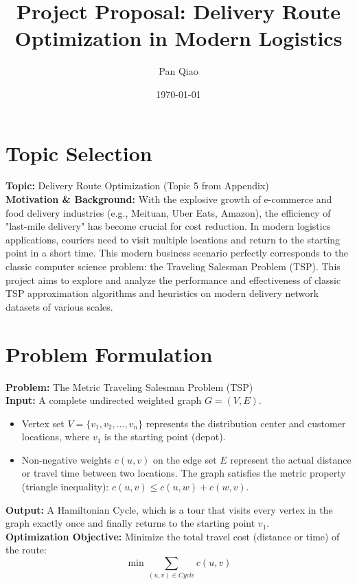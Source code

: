\documentclass[10pt]{article}
\title{\vspace{-1.5cm}Project Proposal: Delivery Route Optimization in Modern Logistics}
\author{Pan Qiao}
\date{\vspace{-0.5cm}\today}
\begin{document}
\maketitle

\section{Topic Selection}
\textbf{Topic:} Delivery Route Optimization (Topic 5 from Appendix)\\
\textbf{Motivation \& Background:} 
With the explosive growth of e-commerce and food delivery industries (e.g., Meituan, Uber Eats, Amazon), the efficiency of "last-mile delivery" has become crucial for cost reduction. In modern logistics applications, couriers need to visit multiple locations and return to the starting point in a short time. This modern business scenario perfectly corresponds to the classic computer science problem: the Traveling Salesman Problem (TSP). This project aims to explore and analyze the performance and effectiveness of classic TSP approximation algorithms and heuristics on modern delivery network datasets of various scales.

\section{Problem Formulation}
\textbf{Problem:} The Metric Traveling Salesman Problem (TSP) \\
\textbf{Input:} A complete undirected weighted graph $G = (V, E)$.
\begin{itemize}
    \item Vertex set $V = \{v_1, v_2, \dots, v_n\}$ represents the distribution center and customer locations, where $v_1$ is the starting point (depot).
    \item Non-negative weights $c(u, v)$ on the edge set $E$ represent the actual distance or travel time between two locations. The graph satisfies the metric property (triangle inequality): $c(u, v) \le c(u, w) + c(w, v)$.
\end{itemize}
\textbf{Output:} A Hamiltonian Cycle, which is a tour that visits every vertex in the graph exactly once and finally returns to the starting point $v_1$.\\
\textbf{Optimization Objective:} Minimize the total travel cost (distance or time) of the route:
\[ \min \sum_{(u,v) \in Cycle} c(u, v) \]
\end{document}
